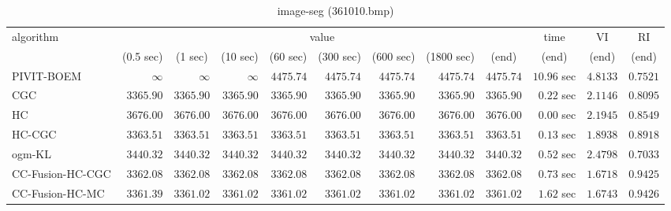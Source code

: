 \begin{table}[H]
\scriptsize
\centering
\caption{image-seg (361010.bmp)}
\label{tab:anytimetable-image-seg-361010.bmp}
\begin{tabular}{lrrrrrrrrrrr}
\toprule
           algorithm &                                   \multicolumn{8}{c}{value} & \multicolumn{1}{c}{time}    & \multicolumn{1}{c}{VI}  & \multicolumn{1}{c}{RI} \\  
\cmidrule(lr){2-9}\cmidrule(lr){10-10} \cmidrule(lr){11-11} \cmidrule(lr){12-12}   
                     & \multicolumn{1}{c}{(0.5 sec)} & \multicolumn{1}{c}{(1 sec)} & \multicolumn{1}{c}{(10 sec)} & \multicolumn{1}{c}{(60 sec)} & \multicolumn{1}{c}{(300 sec)} & \multicolumn{1}{c}{(600 sec)} & \multicolumn{1}{c}{(1800 sec)} & \multicolumn{1}{c}{(end)} & \multicolumn{1}{c}{(end)}    & \multicolumn{1}{c}{(end)}   & \multicolumn{1}{c}{(end)}  \\ \midrule 
          PIVIT-BOEM & $\infty$ & $\infty$ & $\infty$ & $      4475.74$ & $      4475.74$ & $      4475.74$ & $      4475.74$ & $      4475.74$ & $        10.96$ sec    & $       4.8133$  & $       0.7521$ \\ 
                 CGC & $      3365.90$ & $      3365.90$ & $      3365.90$ & $      3365.90$ & $      3365.90$ & $      3365.90$ & $      3365.90$ & $      3365.90$ & $         0.22$ sec    & $       2.1146$  & $       0.8095$ \\ 
                  HC & $      3676.00$ & $      3676.00$ & $      3676.00$ & $      3676.00$ & $      3676.00$ & $      3676.00$ & $      3676.00$ & $      3676.00$ & $         0.00$ sec    & $       2.1945$  & $       0.8549$ \\ 
              HC-CGC & $      3363.51$ & $      3363.51$ & $      3363.51$ & $      3363.51$ & $      3363.51$ & $      3363.51$ & $      3363.51$ & $      3363.51$ & $         0.13$ sec    & $       1.8938$  & $       0.8918$ \\ 
              ogm-KL & $      3440.32$ & $      3440.32$ & $      3440.32$ & $      3440.32$ & $      3440.32$ & $      3440.32$ & $      3440.32$ & $      3440.32$ & $         0.52$ sec    & $       2.4798$  & $       0.7033$ \\ 
    CC-Fusion-HC-CGC & $      3362.08$ & $      3362.08$ & $      3362.08$ & $      3362.08$ & $      3362.08$ & $      3362.08$ & $      3362.08$ & $      3362.08$ & $         0.73$ sec    & $       1.6718$  & $       0.9425$ \\ 
     CC-Fusion-HC-MC & $      3361.39$ & $      3361.02$ & $      3361.02$ & $      3361.02$ & $      3361.02$ & $      3361.02$ & $      3361.02$ & $      3361.02$ & $         1.62$ sec    & $       1.6743$  & $       0.9426$ \\ 

\end{tabular}
\end{table}

